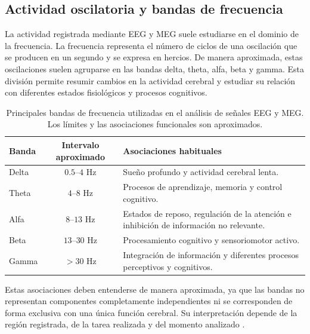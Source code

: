 \subsection{Actividad oscilatoria y bandas de frecuencia}

La actividad registrada mediante EEG y MEG suele estudiarse en el dominio de la frecuencia. La frecuencia representa el número de ciclos de una oscilación que se producen en un segundo y se expresa en hercios. De manera aproximada, estas oscilaciones suelen agruparse en las bandas delta, theta, alfa, beta y gamma. Esta división permite resumir cambios en la actividad cerebral y estudiar su relación con diferentes estados fisiológicos y procesos cognitivos.

\begin{table}[htbp]
\centering
\small
\caption{Principales bandas de frecuencia utilizadas en el análisis de señales EEG y MEG. Los límites y las asociaciones funcionales son aproximados.}
\label{tab}
\begin{tabularx}{\textwidth}{l c X}
\toprule
\textbf{Banda} & \textbf{Intervalo aproximado} & \textbf{Asociaciones habituales} \\
\midrule
Delta & $0{.}5$--$4$ Hz &
Sueño profundo y actividad cerebral lenta. \\

    Theta & $4$--$8$ Hz &
    Procesos de aprendizaje, memoria y control cognitivo. \\

    Alfa & $8$--$13$ Hz &
    Estados de reposo, regulación de la atención e inhibición de información no relevante. \\

    Beta & $13$--$30$ Hz &
    Procesamiento cognitivo y sensoriomotor activo. \\

    Gamma & $>30$ Hz &
    Integración de información y diferentes procesos perceptivos y cognitivos. \\
    \bottomrule
\end{tabularx}

\end{table}

Estas asociaciones deben entenderse de manera aproximada, ya que las bandas no representan componentes completamente independientes ni se corresponden de forma exclusiva con una única función cerebral. Su interpretación depende de la región registrada, de la tarea realizada y del momento analizado \cite{buzsaki2004neuronal,klimesch1999eeg,engel2010beta}.

